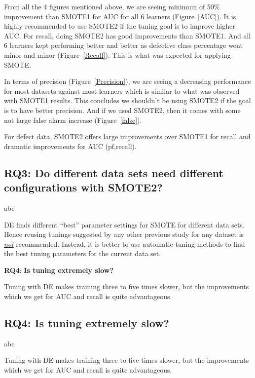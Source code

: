 From all the 4 figures mentioned above, we are seeing minimum of 50\% improvement than SMOTE1 for AUC for all 6 learners (Figure~\ref{AUC}). It is highly recommended to use SMOTE2 if the tuning goal is to improve higher AUC. For recall, doing SMOTE2 has good improvements than SMOTE1. And all 6 learners kept performing better and better as defective class percentage went minor and minor (Figure~\ref{Recall}). This is what was expected for applying SMOTE.

In terms of precision (Figure~\ref{Precision}), we are seeing a decreasing performance for most datasets against most learners which is similar to what was observed with SMOTE1 results. This concludes we shouldn't be using SMOTE2 if the goal is to have better precision. And if we used SMOTE2, then it comes with some not large false alarm increase (Figure~\ref{false}).

\begin{lesson}
    For defect data, SMOTE2  
 offers   large  improvements over SMOTE1 for recall
 and dramatic improvements for AUC (pf,recall).
\end{lesson}

\subsection{\textbf{RQ3: Do different data sets
      need different configurations with SMOTE2?}}

abc

\begin{lesson}
    DE finds different ``best'' parameter settings for SMOTE for different data sets. Hence reusing tunings  suggested  by  any other  previous study  for any dataset is \underline{{\em not}} recommended. Instead,  it is better to
      use  automatic  tuning  methods  to find the best tuning parameters for the current data set.
\end{lesson}

   \textbf{RQ4}: \textbf{Is tuning extremely slow?} 
 
 \begin{lesson}Tuning with DE makes training three to five times slower, but the improvements which we get for AUC and recall is quite advantageous.
 \end{lesson}
 
 

\subsection{\textbf{RQ4: Is tuning extremely slow?}}

abc

\begin{lesson}
    Tuning with DE makes training three to five times slower, but the improvements which we get for AUC and recall is quite advantageous.
\end{lesson}
